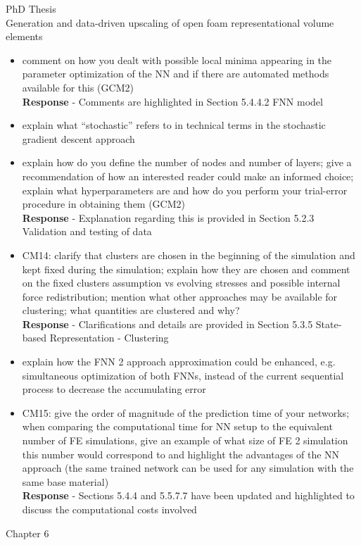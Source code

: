 \documentclass[12pt]{letter}
\begin{document}
\begin{letter}{PhD Thesis\\
Generation and data-driven upscaling of open foam representational volume elements}
\begin{itemize}
\item comment on how you dealt with possible local minima appearing in the parameter
optimization of the NN and if there are automated methods available for this
(GCM2)
\\\textbf{Response} - Comments are highlighted in Section 5.4.4.2 FNN model

\item explain what “stochastic” refers to in technical terms in the stochastic gradient
descent approach

\item explain how do you define the number of nodes and number of layers; give a
recommendation of how an interested reader could make an informed choice;
explain what hyperparameters are and how do you perform your trial-error
procedure in obtaining them (GCM2)
\\\textbf{Response} - Explanation regarding this is provided in Section 5.2.3 Validation and testing of data

\item CM14: clarify that clusters are chosen in the beginning of the simulation and kept
fixed during the simulation; explain how they are chosen and comment on the fixed
clusters assumption vs evolving stresses and possible internal force redistribution;
mention what other approaches may be available for clustering; what quantities are
clustered and why?
\\\textbf{Response} - Clarifications and details are provided in Section 5.3.5 State-based Representation - Clustering

\item explain how the FNN 2 approach approximation could be enhanced, e.g.
simultaneous optimization of both FNNs, instead of the current sequential process
to decrease the accumulating error

\item CM15: give the order of magnitude of the prediction time of your networks; when
comparing the computational time for NN setup to the equivalent number of FE
simulations, give an example of what size of FE 2 simulation this number would
correspond to and highlight the advantages of the NN approach (the same trained
network can be used for any simulation with the same base material)
\\\textbf{Response} - Sections 5.4.4 and 5.5.7.7 have been updated and highlighted to discuss the computational costs involved

\end{itemize}
Chapter 6


\end{letter}
\end{document}
